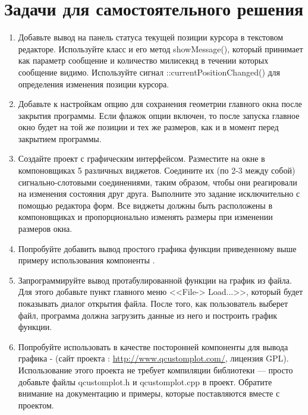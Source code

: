 \section[Задачи для самостоятельного решения]{Задачи для самостоятельного решения}
\begin{enumerate}
\item Добавьте вывод на панель статуса текущей позиции курсора в текстовом редакторе. Используйте класс  и его
метод showMessage(), который принимает как параметр сообщение и количество милисекнд в течении которых сообщение
видимо. Используйте сигнал ::currentPositionChanged() для определения изменения позиции курсора.
\item Добавьте к настройкам опцию для сохранения геометрии главного окна после закрытия программы. Если флажок опции
включен, то после запуска главное окно будет на той же позиции и тех же размеров, как и в момент перед закрытием
программы. 
\item Создайте проект с графическим интерфейсом. Разместите на окне в компоновщиках 5 различных виджетов. Соедините их
(по 2-3 между собой) сигнально-слотовыми соединениями, таким образом, чтобы они реагировали на изменения состояния друг
друга. Выполните это задание исключительно с помощью редактора форм. Все виджеты должны быть расположены в
компоновщиках и пропорционально изменять размеры при изменении размеров окна.
\item Попробуйте добавить вывод простого графика функции приведенному выше примеру использования компоненты .
\item Запрограммируйте вывод протабулированной функции на график из файла. Для этого добавьте пункт главного меню
<<File-{>} Load...>>, который будет показывать диалог открытия файла. После того, как
пользователь выберет файл, программа должна загрузить данные из него и построить график функции.
\item Попробуйте использовать в качестве посторонней компоненты для вывода графика  -  (сайт проекта :
\url{http://www.qcustomplot.com/}, лицензия GPL). Использование этого проекта не требует компиляции библиотеки --- просто
добавьте файлы qcustomplot.h и  qcustomplot.cpp в проект. Обратите внимание на документацию и примеры, которые
поставляются вместе с проектом.
\end{enumerate}
